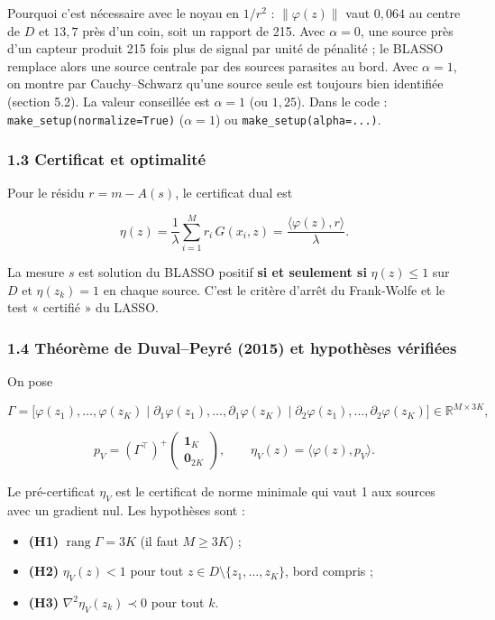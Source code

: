 \documentclass[
  french,
]{article}
\providecommand{\tightlist}{%
  \setlength{\itemsep}{0pt}\setlength{\parskip}{0pt}}
\begin{document}
Pourquoi c'est nécessaire avec le noyau en \(1/r^2\) :
\(\lVert\varphi(z)\rVert\) vaut \(0{,}064\) au centre de \(D\) et
\(13{,}7\) près d'un coin, soit un rapport de 215. Avec \(\alpha = 0\),
une source près d'un capteur produit 215 fois plus de signal par unité
de pénalité ; le BLASSO remplace alors une source centrale par des
sources parasites au bord. Avec \(\alpha = 1\), on montre par
Cauchy--Schwarz qu'une source seule est toujours bien identifiée
(section 5.2). La valeur conseillée est \(\alpha = 1\) (ou \(1{,}25\)).
Dans le code : \texttt{make\_setup(normalize=True)} (\(\alpha = 1\)) ou
\texttt{make\_setup(alpha=...)}.

\subsubsection{1.3 Certificat et
optimalité}\label{certificat-et-optimalituxe9}

Pour le résidu \(r = m - A(s)\), le certificat dual est

\[
\eta(z) = \frac{1}{\lambda}\sum_{i=1}^{M} r_i\,G(x_i, z) = \frac{\langle\varphi(z), r\rangle}{\lambda}.
\]

La mesure \(s\) est solution du BLASSO positif \textbf{si et seulement
si} \(\eta(z)\le 1\) sur \(D\) et \(\eta(z_k) = 1\) en chaque source.
C'est le critère d'arrêt du Frank-Wolfe et le test « certifié » du
LASSO.

\subsubsection{1.4 Théorème de Duval--Peyré (2015) et hypothèses
vérifiées}\label{thuxe9oruxe8me-de-duvalpeyruxe9-2015-et-hypothuxe8ses-vuxe9rifiuxe9es}

On pose

\[
\Gamma = \big[\varphi(z_1),\dots,\varphi(z_K)\;\big\vert\;\partial_1\varphi(z_1),\dots,\partial_1\varphi(z_K)\;\big\vert\;\partial_2\varphi(z_1),\dots,\partial_2\varphi(z_K)\big] \in \mathbb{R}^{M\times 3K},
\]

\[
p_V = (\Gamma^{\top})^{+}\begin{pmatrix}\mathbf{1}_K\\ \mathbf{0}_{2K}\end{pmatrix},
\qquad \eta_V(z) = \langle\varphi(z), p_V\rangle .
\]

Le pré-certificat \(\eta_V\) est le certificat de norme minimale qui
vaut 1 aux sources avec un gradient nul. Les hypothèses sont :

\begin{itemize}
\tightlist
\item
  \textbf{(H1)} \(\operatorname{rang}\Gamma = 3K\) (il faut \(M\ge 3K\))
  ;
\item
  \textbf{(H2)} \(\eta_V(z) < 1\) pour tout
  \(z\in D\setminus\{z_1,\dots,z_K\}\), bord compris ;
\item
  \textbf{(H3)} \(\nabla^2\eta_V(z_k)\prec 0\) pour tout \(k\).
\end{itemize}
\end{document}

